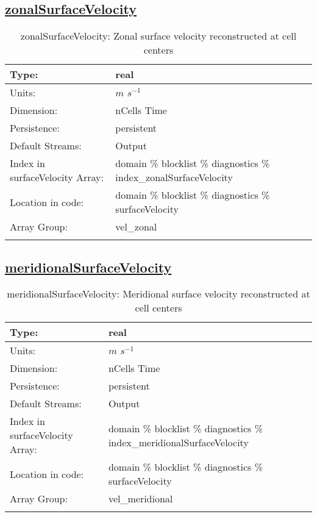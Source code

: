 \subsection[zonalSurfaceVelocity]{\hyperref[sec:var_tab_diagnostics]{zonalSurfaceVelocity}}
\label{subsec:var_sec_diagnostics_zonalSurfaceVelocity}
\begin{center}
\begin{longtable}{| p{2.0in} | p{4.0in} |}
        \hline 
        Type: & real \\
        \hline 
        Units: & $m$ $s^{-1}$ \\
        \hline 
        Dimension: & nCells Time \\
        \hline 
        Persistence: & persistent \\
        \hline 
		 Default Streams: & Output  \\
        \hline 
		 Index in surfaceVelocity Array: & domain \% blocklist \% diagnostics \% index\_zonalSurfaceVelocity \\
		 \hline 
		 Location in code: & domain \% blocklist \% diagnostics \% surfaceVelocity \\
		 \hline 
		 Array Group: & vel\_zonal \\
		 \hline 
    \caption{zonalSurfaceVelocity: Zonal surface velocity reconstructed at cell centers}
\end{longtable}
\end{center}
\subsection[meridionalSurfaceVelocity]{\hyperref[sec:var_tab_diagnostics]{meridionalSurfaceVelocity}}
\label{subsec:var_sec_diagnostics_meridionalSurfaceVelocity}
\begin{center}
\begin{longtable}{| p{2.0in} | p{4.0in} |}
        \hline 
        Type: & real \\
        \hline 
        Units: & $m$ $s^{-1}$ \\
        \hline 
        Dimension: & nCells Time \\
        \hline 
        Persistence: & persistent \\
        \hline 
		 Default Streams: & Output  \\
        \hline 
		 Index in surfaceVelocity Array: & domain \% blocklist \% diagnostics \% index\_meridionalSurfaceVelocity \\
		 \hline 
		 Location in code: & domain \% blocklist \% diagnostics \% surfaceVelocity \\
		 \hline 
		 Array Group: & vel\_meridional \\
		 \hline 
    \caption{meridionalSurfaceVelocity: Meridional surface velocity reconstructed at cell centers}
\end{longtable}
\end{center}

